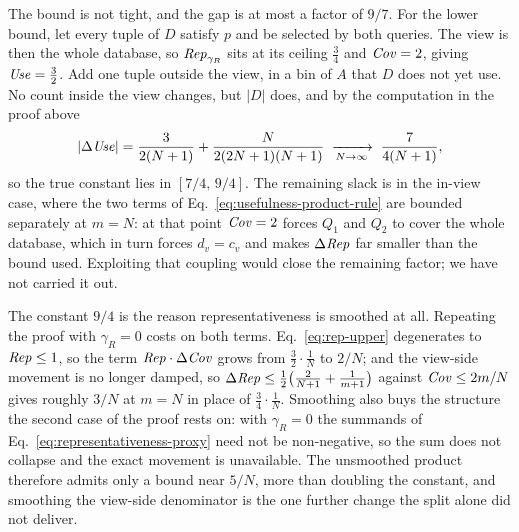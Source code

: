 \begin{remark}[Tightness]
\label{rem:usefulness-tightness}
The bound is not tight, and the gap is at most a factor of $9/7$.
For the lower bound, let every tuple of $D$ satisfy $p$ and be selected by both queries.
The view is then the whole database, so $\mathit{Rep}_{\gamma_R}$ sits at its ceiling $\tfrac34$ and $\mathit{Cov}=2$, giving $\mathit{Use}=\tfrac32$.
Add one tuple outside the view, in a bin of $A$ that $D$ does not yet use.
No count inside the view changes, but $|D|$ does, and by the computation in the proof above
\[
|\Delta\mathit{Use}|=\frac{3}{2(N+1)}+\frac{N}{2(2N+1)(N+1)}\;\xrightarrow[N\to\infty]{}\;\frac{7}{4(N+1)} ,
\]
so the true constant lies in $[7/4,\,9/4]$.
The remaining slack is in the in-view case, where the two terms of Eq.~\eqref{eq:usefulness-product-rule} are bounded separately at $m=N$: at that point $\mathit{Cov}=2$ forces $Q_1$ and $Q_2$ to cover the whole database, which in turn forces $d_v=c_v$ and makes $\Delta\mathit{Rep}$ far smaller than the bound used.
Exploiting that coupling would close the remaining factor; we have not carried it out.
\end{remark}


The constant $9/4$ is the reason representativeness is smoothed at all.
Repeating the proof with $\gamma_R=0$ costs on both terms.
Eq.~\eqref{eq:rep-upper} degenerates to $\mathit{Rep}\le1$, so the term $\mathit{Rep}\cdot\Delta\mathit{Cov}$ grows from $\tfrac32\cdot\tfrac1N$ to $2/N$; and the view-side movement is no longer damped, so $\Delta\mathit{Rep}\le\tfrac12\big(\tfrac{2}{N+1}+\tfrac1{m+1}\big)$ against $\mathit{Cov}\le2m/N$ gives roughly $3/N$ at $m=N$ in place of $\tfrac34\cdot\tfrac1N$.
Smoothing also buys the structure the second case of the proof rests on: with $\gamma_R=0$ the summands of Eq.~\eqref{eq:representativeness-proxy} need not be non-negative, so the sum does not collapse and the exact movement is unavailable.
The unsmoothed product therefore admits only a bound near $5/N$, more than doubling the constant, and smoothing the view-side denominator is the one further change the split alone did not deliver.


